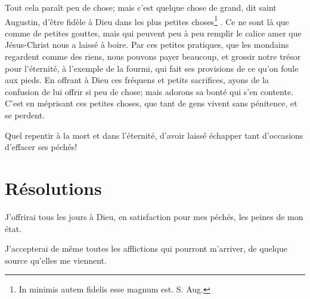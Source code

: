 \documentclass[instructions.tex]{subfiles}
\begin{document}
Tout cela paraît peu de chose; mais c’est quelque chose de grand, dit saint Augustin, d’être fidèle à Dieu dans les plus petites choses\footnote{In minimis autem fidelis esse magnum est. S. Aug.} . Ce ne sont là que comme de petites gouttes, mais qui peuvent peu à peu remplir le calice amer que Jésus-Christ nous a laissé à boire. Par ces petites pratiques, que les mondains regardent comme des riens, nous pouvons payer beaucoup, et grossir notre trésor pour l’éternité, à l’exemple de la fourmi, qui fait ses provisions de ce qu’on foule aux pieds. En offrant à Dieu ces fréquens et petits sacrifices, ayons de la confusion de lui offrir si peu de chose; mais adorons sa bonté qui s’en contente. C’est en méprisant ces petites choses, que tant de gens vivent sans pénitence, et se perdent.
 
Quel repentir à la mort et dans l’éternité, d’avoir laissé échapper tant d’occasions d’effacer ses péchés!
 
\section{Résolutions}
 
\primo J’offrirai tous les jours à Dieu, en satisfaction pour mes péchés, les peines de mon état.
 
\secundo J’accepterai de même toutes les afflictions qui pourront m’arriver, de quelque source qu’elles me viennent. 

 
\end{document}
